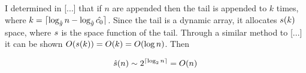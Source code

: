 I determined in [...] that if $n$ are appended then the tail is appended to $k$ times, where $k = \lceil \log_{\hat{g}} n - \log_{\hat{g}} \hat{c_0} \rceil$. Since the tail is a dynamic array, it allocates $s(k)$ space, where $s$ is the space function of the tail. Through a similar method to [...] it can be shown $O(s(k)) = O(k) = O(\log n)$. Then %

\begin{align*}
\hat{s}(n) \sim 2^{\lceil \log_2 n \rceil} = O(n)
\end{align*}